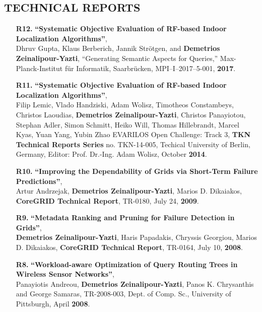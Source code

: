 \documentclass[10pt]{article}
\begin{document}
\subsection*{\bf TECHNICAL REPORTS}
\begin{enumerate}


\item [{\bf R12.}]
\label{R12}
\label{mpi2017}
{\bf ``Systematic Objective Evaluation of RF-based Indoor Localization Algorithms''},\\
Dhruv Gupta, Klaus Berberich, Jannik Strötgen, and {\bf Demetrios Zeinalipour-Yazti},
“Generating Semantic Aspects for Queries,” Max-Planck-Institut für Informatik, Saarbrücken, MPI–I–2017–5-001, {\bf 2017}.

\item [{\bf R11.}]
\label{R11}
\label{evarilos2014}
{\bf ``Systematic Objective Evaluation of RF-based Indoor Localization Algorithms''},\\
Filip Lemic, Vlado Handziski, Adam Wolisz, Timotheos Constambeys, Christos Laoudias, {\bf Demetrios Zeinalipour-Yazti}, Christos Panayiotou, Stephan Adler, Simon Schmitt, Heiko Will, Thomas Hillebrandt, Marcel Kyas, Yuan Yang, Yubin Zhao
EVARILOS Open Challenge: Track 3, {\bf TKN Technical Reports Series} no. TKN-14-005, Techical University of Berlin, Germany, Editor: Prof. Dr.-Ing. Adam Wolisz, October {\bf 2014}.

\item [{\bf R10.}]
\label{R10}
\label{coregridTR180}
{\bf ``Improving the Dependability of Grids via Short-Term Failure Predictions''},\\
Artur Andrzejak, {\bf Demetrios Zeinalipour-Yazti}, Marios D. Dikaiakos, 
{\bf CoreGRID Technical Report}, TR-0180, July 24, {\bf 2009}.  

\item [{\bf R9.}]
\label{R9}
\label{coregridTR164}
{\bf ``Metadata Ranking and Pruning for Failure Detection in Grids''},\\
{\bf Demetrios Zeinalipour-Yazti}, Haris Papadakis, Chryssis Georgiou, Marios D. Dikaiakos, 
{\bf CoreGRID Technical Report}, TR-0164, July 10, {\bf 2008}.  

\item [{\bf R8.}]
\label{R8}
{\bf ``Workload-aware Optimization of Query Routing Trees in Wireless Sensor Networks''}, \\
Panayiotis Andreou, {\bf Demetrios Zeinalipour-Yazti}, Panos K. Chrysanthis and George Samaras,
TR-2008-003, Dept. of Comp. Sc., University of Pittsburgh, April {\bf 2008}.  


\end{enumerate}
\end{document}
